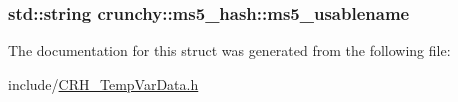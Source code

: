 \subsubsection[{ms5\+\_\+usablename}]{\setlength{\rightskip}{0pt plus 5cm}std\+::string crunchy\+::ms5\+\_\+hash\+::ms5\+\_\+usablename}\label{structcrunchy_1_1ms5__hash_a375a1251bbe67bb9928f1b4154154ef0}


The documentation for this struct was generated from the following file\+:\begin{DoxyCompactItemize}
\item 
include/\hyperlink{_c_r_h___temp_var_data_8h}{C\+R\+H\+\_\+\+Temp\+Var\+Data.\+h}\end{DoxyCompactItemize}
